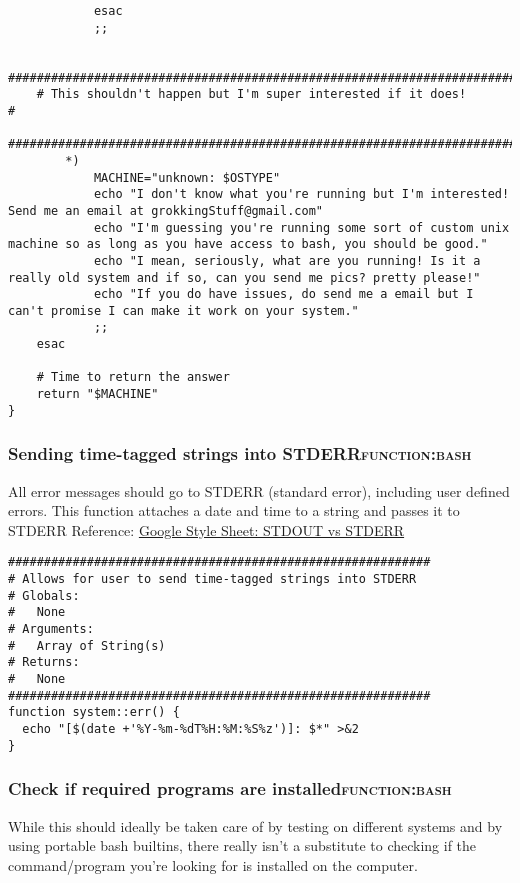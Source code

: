 \documentclass[11pt]{article}
\begin{document}
\begin{verbatim}
            esac
            ;;

    #########################################################################
    # This shouldn't happen but I'm super interested if it does!            #
    #########################################################################
        *)
            MACHINE="unknown: $OSTYPE"
            echo "I don't know what you're running but I'm interested! Send me an email at grokkingStuff@gmail.com"
            echo "I'm guessing you're running some sort of custom unix machine so as long as you have access to bash, you should be good."
            echo "I mean, seriously, what are you running! Is it a really old system and if so, can you send me pics? pretty please!"
            echo "If you do have issues, do send me a email but I can't promise I can make it work on your system."
            ;;
    esac

    # Time to return the answer
    return "$MACHINE"
}
\end{verbatim}

\subsubsection{Sending time-tagged strings into STDERR\hfill{}\textsc{function:bash}}
\label{sec:orgb4fae8d}

All error messages should go to STDERR (standard error), including user defined errors. This function attaches a date and time to a string and passes it to STDERR
Reference: \href{https://google.github.io/styleguide/shell.xml?showone=STDOUT\_vs\_STDERR\#STDOUT\_vs\_STDERR}{Google Style Sheet: STDOUT vs STDERR}

\begin{verbatim}
###########################################################
# Allows for user to send time-tagged strings into STDERR
# Globals:
#   None
# Arguments:
#   Array of String(s)
# Returns:
#   None
###########################################################
function system::err() {
  echo "[$(date +'%Y-%m-%dT%H:%M:%S%z')]: $*" >&2
}
\end{verbatim}

\subsubsection{Check if required programs are installed\hfill{}\textsc{function:bash}}
\label{sec:orgd03c6fc}
While this should ideally be taken care of by testing on different systems and by using portable bash builtins, there really isn't a substitute to checking if the command/program you're looking for is installed on the computer.
\end{document}
